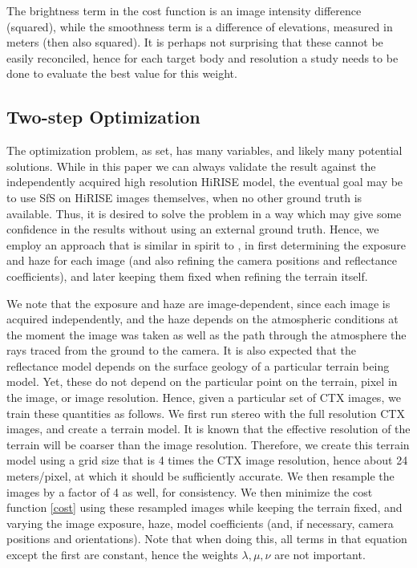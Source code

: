 \documentclass[draft,linenumbers]{agujournal}
\begin{document}
The brightness term in the cost function is an image
intensity difference (squared), while the smoothness term is a
difference of elevations, measured in meters (then also squared).
It is perhaps not surprising that these cannot be easily reconciled,
hence for each target body and resolution a study needs to be done to evaluate the best value for this weight.

\subsection{Two-step Optimization}
\label{twostep}
The optimization problem, as set, has many variables, and likely many potential solutions. While in this paper we can always validate the result against the independently acquired high resolution HiRISE model,
the eventual goal may be to use SfS on HiRISE images themselves, when no other ground truth is available. 
Thus, it is desired to solve the problem in a way which may give some confidence in the results without
using an external ground truth. Hence, we employ an approach that is similar in spirit to \citep{wohlfarth2018high}, in first determining the exposure and haze for each image (and also refining the camera positions and reflectance coefficients), and later keeping them fixed when refining the terrain itself. 

We note that the exposure and haze are image-dependent, since each image is acquired independently, and the haze depends on the atmospheric conditions at the moment the image was taken as well as
the path through the atmosphere the rays traced from the ground to the camera. It is also expected
that the reflectance model depends on the surface geology of a particular terrain being model. 
Yet, these do not depend on the particular point on the terrain, pixel in the image,
or image resolution. Hence, given a particular set of CTX images, we train these quantities as follows.
We first run stereo with the full resolution CTX images, and create a terrain model. It is known that
the effective resolution of the terrain will be coarser than the image resolution. Therefore,  
we create this terrain model using a grid size that is 4 times the CTX image resolution, hence 
about 24 meters/pixel, at which it should be sufficiently accurate. We then resample the images by a factor of 4 as well, for consistency. We then minimize the cost function \ref{cost} using these resampled images while keeping the terrain fixed, and varying the image exposure, haze, model coefficients (and, if necessary, camera positions and orientations). Note that when doing this, all terms in that equation except the first are constant, hence the weights $\lambda, \mu, \nu$ are not important. 
\end{document}
